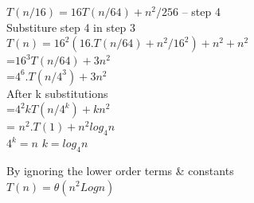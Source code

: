 \documentclass[11pt]{article}
\begin{document}
\begin{enumerate}
$T(n/16) = 16T(n/64)+n^2/256$ -- step 4 \\

Substiture step 4 in step 3 \\


$T(n) = 16^2 (16.T(n/64)+n^2/16^2)+n^2+n^2$ \\

      =$16^3T(n/64) + 3n^2$ \\

      =$4^6.T(n/4^3)+3n^2$ \\

After k substitutions \\


    =$4^2k T(n/4^k)+kn^2$\\
    = $n^2.T(1)+n^2 log_4n$\\
    
$4^k = n$ 
$k = log_4n$ 

By ignoring the lower order terms & constants \\

$T(n) = \theta (n^2 Log n)$














\end{enumerate}
\end{document}
